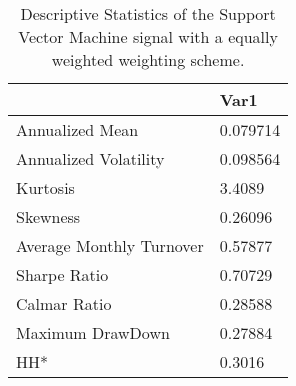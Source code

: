 \begin{table}[H]
\centering
\begin{tabular}{ll}
\hline& Var1 \\ 
\hline 
Annualized Mean & 0.079714 \\ 
Annualized Volatility & 0.098564 \\ 
Kurtosis & 3.4089 \\ 
Skewness & 0.26096 \\ 
Average Monthly Turnover & 0.57877 \\ 
Sharpe Ratio & 0.70729 \\ 
Calmar Ratio & 0.28588 \\ 
Maximum DrawDown & 0.27884 \\ 
HH* & 0.3016 \\ 
\hline
\end{tabular}
\caption{Descriptive Statistics of the Support Vector Machine signal with a equally weighted weighting scheme.}
\label{SVM_MODEL_EW}
\end{table}